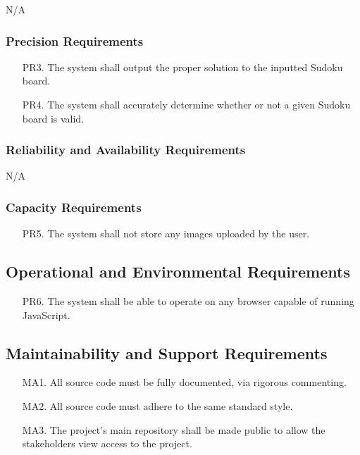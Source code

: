 \documentclass[11pt]{article}
\begin{document}
N/A

\subsubsection{Precision Requirements}

\begin{enumerate}
    \item [PR3.] The system shall output the proper solution to the inputted Sudoku board.
    \item [PR4.] The system shall accurately determine whether or not a given Sudoku board is valid.
\end{enumerate}

\subsubsection{Reliability and Availability Requirements} %

N/A

\subsubsection{Capacity Requirements} %

\begin{enumerate}
    \item [PR5.] The system shall not store any images uploaded by the user.
\end{enumerate}

\subsection{Operational and Environmental Requirements}

\begin{enumerate}
    \item [PR6.] The system shall be able to operate on any browser capable of running JavaScript.
\end{enumerate}

\subsection{Maintainability and Support Requirements} %

\begin{enumerate}
    \item [MA1.] All source code must be fully documented, via rigorous commenting.
    
    \item [MA2.] All source code must adhere to the same standard style.
    
    \item [MA3.] The project's main repository shall be made public to allow the stakeholders view access to the project.
\end{enumerate}
\end{document}
